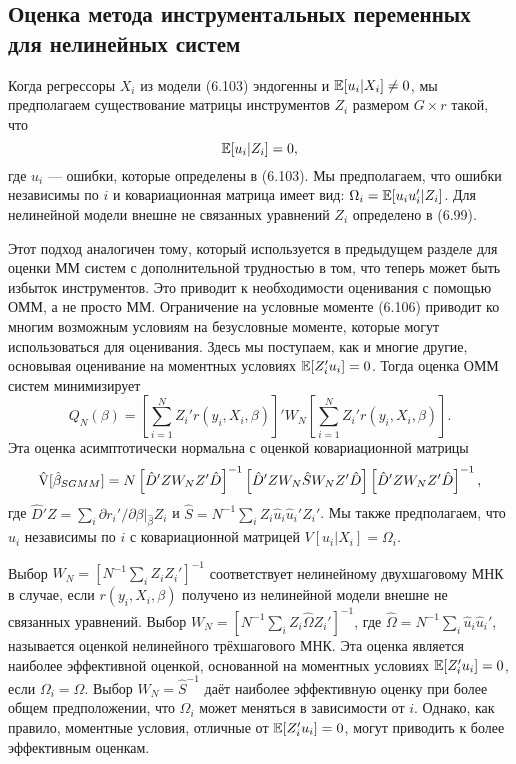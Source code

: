 \subsection{Оценка метода инструментальных переменных для нелинейных систем}

Когда регрессоры $X_i$ из модели (6.103) эндогенны и $\mathbb{E}[u_i|X_i] \not= 0$, мы предполагаем существование матрицы инструментов $Z_i$ размером $G \times r$ такой, что
\begin{equation}
\mathbb{E}[u_i|Z_i] = 0,
\end{equation}
где $u_i$ --- ошибки, которые определены в (6.103). Мы предполагаем, что ошибки независимы по $i$ и ковариационная матрица имеет вид: $\Omega_i = \mathbb{E}[u_iu_i'|Z_i]$. Для нелинейной  модели внешне не связанных уравнений $Z_i$ определено в (6.99).

Этот подход аналогичен тому, который используется в предыдущем разделе для оценки ММ систем с дополнительной трудностью в том, что теперь может быть избыток инструментов. Это приводит к необходимости оценивания с помощью ОММ, а не просто ММ. Ограничение на условные моменте (6.106) приводит ко многим возможным условиям на безусловные моменте, которые могут использоваться для оценивания. Здесь мы поступаем, как и многие другие, основывая оценивание на моментных  условиях $\mathbb{E}[Z_i'u_i] = 0$. Тогда оценка ОММ систем минимизирует
\begin{equation}
Q_N(\beta) = \left[ \sum_{i=1}^N Z_i'r(y_i,X_i, \beta) \right]'W_N \left[ \sum_{i=1}^N Z_i'r(y_i,X_i, \beta) \right].
\end{equation}
Эта оценка асимптотически нормальна с оценкой ковариационной матрицы
\begin{equation}
\hat{\mathrm{V}}[\hat{\beta}_{SGMM}] = N\left[ \hat{D}'ZW_N Z'\hat{D} \right]^{-1} \left[ \hat{D}'ZW_N\hat{S}W_NZ'\hat{D} \right] \left[ \hat{D}'ZW_N Z'\hat{D} \right]^{-1},
\end{equation}
где $\hat{D}'Z = \sum_i \partial{r_i'}/\partial{\beta}|_{\hat{\beta}}Z_i$ и $\hat{S} = N^{-1}\sum_i Z_i\hat{u}_i\hat{u}_i'Z_i'$. Мы также предполагаем, что $u_i$ независимы по $i$ с ковариационной матрицей $V[u_i|X_i] = \Omega_i$.

Выбор $W_N = [N^{-1}\sum_i Z_iZ_i']^{-1}$ соответствует нелинейному двухшаговому МНК в случае, если $r(y_i,X_i, \beta)$ получено из нелинейной  модели внешне не связанных уравнений. Выбор $W_N = [N^{-1}\sum_i Z_i\hat{\Omega}Z_i']^{-1}$, где $\hat{\Omega} = N^{-1}\sum_i \hat{u}_i\hat{u}_i'$, называется оценкой нелинейного трёхшагового МНК. Эта оценка является наиболее эффективной оценкой, основанной на моментных условиях $\mathbb{E}[Z_i'u_i] = 0$, если $\Omega_i = \Omega$. Выбор $W_N = \hat{S}^{-1}$ даёт наиболее эффективную оценку при более общем предположении, что $\Omega_i$ может меняться в зависимости от $i$. Однако, как правило, моментные условия, отличные от $\mathbb{E}[Z_i'u_i] = 0$, могут приводить к более эффективным оценкам.

